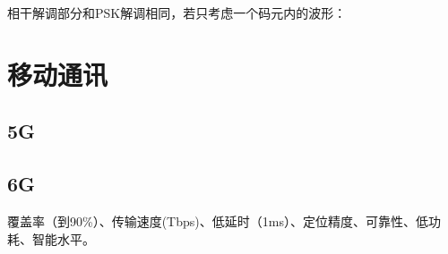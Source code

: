         相干解调部分和PSK解调相同，若只考虑一个码元内的波形：

    \section{移动通讯}
    \subsection{5G}

    \subsection{6G}

    覆盖率（到90\%）、传输速度(Tbps)、低延时（1ms）、定位精度、可靠性、低功耗、智能水平。

    
    